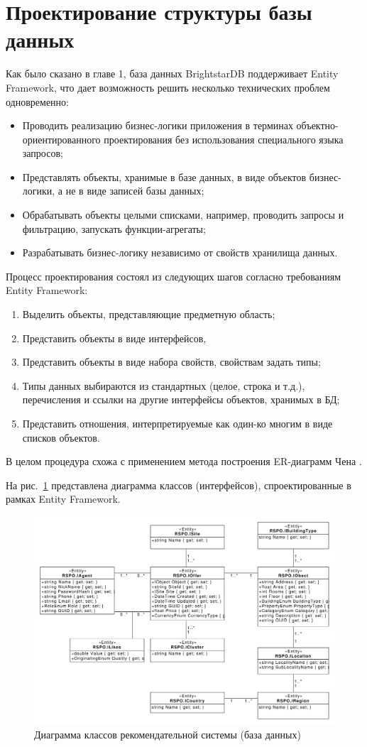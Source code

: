 \documentclass[a4paper,14pt,openany,final]{extreport} %
\begin{document}
\section{Проектирование структуры базы данных}

Как было сказано в главе 1, база данных BrightstarDB поддерживает Entity Framework, что дает возможность решить несколько технических проблем одновременно:
\begin{itemize}
\item Проводить реализацию бизнес-логики приложения в терминах объектно-ориентированного проектирования без использования специального языка запросов;
\item Представлять объекты, хранимые в базе данных, в виде объектов бизнес-логики, а не в виде записей базы данных;
\item Обрабатывать объекты целыми списками, например, проводить запросы и фильтрацию, запускать функции-агрегаты;
\item Разрабатывать бизнес-логику независимо от свойств хранилища данных.
\end{itemize}

Процесс проектирования состоял из следующих шагов согласно требованиям Entity Framework:
\begin{enumerate}
\item Выделить объекты, представляющие предметную область;
\item Представить объекты в виде интерфейсов,
\item Представить объекты в виде набора свойств, свойствам задать типы;
\item Типы данных выбираются из стандартных (целое, строка и т.д.), перечисления и ссылки на другие интерфейсы объектов, хранимых в БД;
\item Представить отношения, интерпретируемые как один-ко многим в виде списков объектов.
\end{enumerate}
В целом процедура схожа с применением метода построения ER-диаграмм Чена \cite{erdiagrams}.

На рис.~\ref{fig:classdiagram} представлена диаграмма классов (интерфейсов), спроектированные в рамках Entity Framework.

\begin{figure}[htbp]
  \centering
  \includegraphics[width=0.9\linewidth]{class_diagram.pdf}
  \caption{Диаграмма классов рекомендательной системы (база данных)}
  \label{fig:classdiagram}
\end{figure}
\end{document}
